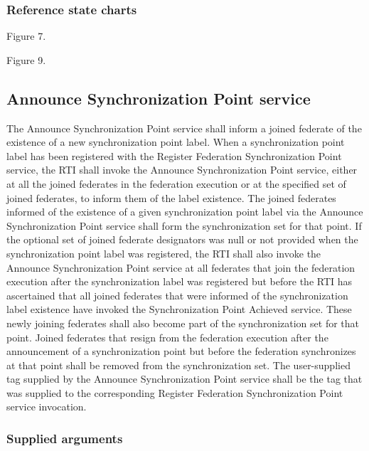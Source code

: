 \subsubsection{Reference state charts}

\begin{stdalphalist}
    \item Figure 7.
    \item Figure 9.
\end{stdalphalist}

\subsection{Announce Synchronization Point \rtiinitiated{} service}

The Announce Synchronization Point \rtiinitiated{} service shall inform a joined federate of the existence of a new synchronization point label. When a synchronization point label has been registered with the Register Federation Synchronization Point service, the RTI shall invoke the Announce Synchronization Point \rtiinitiated{} service, either at all the joined federates in the federation execution or at the specified set of joined federates, to inform them of the label existence. The joined federates informed of the existence of a given synchronization point label via the Announce Synchronization Point \rtiinitiated{} service shall form the synchronization set for that point. If the optional set of joined federate designators was null or not provided when the synchronization point label was registered, the RTI shall also invoke the Announce Synchronization Point \rtiinitiated{} service at all federates that join the federation execution after the synchronization label was registered but before the RTI has ascertained that all joined federates that were informed of the synchronization label existence have invoked the Synchronization Point Achieved service. These newly joining federates shall also become part of the synchronization set for that point. Joined federates that resign from the federation execution after the announcement of a synchronization point but before the federation synchronizes at that point shall be removed from the synchronization set. The user-supplied tag supplied by the Announce Synchronization Point \rtiinitiated{} service shall be the tag that was supplied to the corresponding Register Federation Synchronization Point service invocation.

\subsubsection{Supplied arguments}

